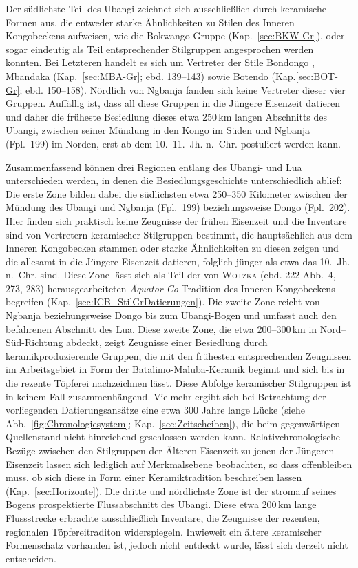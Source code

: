 Der südlichste Teil des \mbox{Ubangi} zeichnet sich ausschließlich durch keramische Formen aus, die entweder starke Ähnlichkeiten zu Stilen des Inneren Kongobeckens aufweisen, wie die Bokwango-Gruppe (Kap.~\ref{sec:BKW-Gr}), oder sogar eindeutig als Teil entsprechender Stilgruppen angesprochen werden konnten. Bei Letzteren handelt es sich um Vertreter der Stile Bondongo \parencite[Kap.~\ref{sec:BDG-Gr};][128--139]{Wotzka.1995}, Mbandaka (Kap.~\ref{sec:MBA-Gr}; ebd. 139--143) sowie Botendo (Kap.\ref{sec:BOT-Gr}; ebd. 150--158). Nördlich von \mbox{Ngbanja} fanden sich keine Vertreter dieser vier Gruppen. Auffällig ist, dass all diese Gruppen in die Jüngere Eisenzeit datieren und daher die früheste Besiedlung dieses etwa 250\,km langen Abschnitts des \mbox{Ubangi}, zwischen seiner Mündung in den Kongo im Süden und \mbox{Ngbanja} (Fpl.~199) im Norden, erst ab dem \mbox{10.--11.~Jh.} n.~Chr. postuliert werden kann.

Zusammenfassend können drei Regionen entlang des \mbox{Ubangi}- und Lua unterschieden werden, in denen die Besiedlungsgeschichte unterschiedlich ablief: Die erste Zone bilden dabei die südlichsten etwa 250--350 Kilometer zwischen der Mündung des \mbox{Ubangi} und \mbox{Ngbanja} (Fpl.~199) beziehungsweise Dongo (Fpl.~202). Hier finden sich praktisch keine Zeugnisse der frühen Eisenzeit und die Inventare sind von Vertretern keramischer Stilgruppen bestimmt, die hauptsächlich aus dem Inneren Kongobecken stammen oder starke Ähnlichkeiten zu diesen zeigen und die allesamt in die Jüngere Eisenzeit datieren, folglich jünger als etwa das 10.~Jh. n.~Chr. sind. Diese Zone lässt sich als Teil der von \textsc{Wotzka} (ebd. 222 Abb.~4, 273, 283) herausgearbeiteten \textit{Äquator-Co}-Tradition des Inneren Kongobeckens begreifen (Kap.~\ref{sec:ICB_StilGrDatierungen}). Die zweite Zone reicht von \mbox{Ngbanja} beziehungsweise Dongo bis zum \mbox{Ubangi}-Bogen und umfasst auch den befahrenen Abschnitt des Lua. Diese zweite Zone, die etwa 200--300\,km in Nord--Süd-Richtung abdeckt, zeigt Zeugnisse einer Besiedlung durch keramikproduzierende Gruppen, die mit den frühesten entsprechenden Zeugnissen im Arbeitsgebiet in Form der Batalimo-Maluba-Keramik beginnt und sich bis in die rezente Töpferei nachzeichnen lässt. Diese Abfolge keramischer Stilgruppen ist in keinem Fall zusammenhängend. Vielmehr ergibt sich bei Betrachtung der vorliegenden Datierungsansätze eine etwa 300 Jahre lange Lücke (siehe Abb.~\ref{fig:Chronologiesystem}; Kap.~\ref{sec:Zeitscheiben}), die beim gegenwärtigen Quellenstand nicht hinreichend geschlossen werden kann. Relativchronologische Bezüge zwischen den Stilgruppen der Älteren Eisenzeit zu jenen der Jüngeren Eisenzeit lassen sich lediglich auf Merkmalsebene beobachten, so dass offenbleiben muss, ob sich diese in Form einer Keramiktradition beschreiben lassen (Kap.~\ref{sec:Horizonte}). Die dritte und nördlichste Zone ist der stromauf seines Bogens prospektierte Flussabschnitt des \mbox{Ubangi}. Diese etwa 200\,km lange Flussstrecke erbrachte ausschließlich Inventare, die Zeugnisse der rezenten, regionalen Töpfereitraditon widerspiegeln. Inwieweit ein ältere keramischer Formenschatz vorhanden ist, jedoch nicht entdeckt wurde, lässt sich derzeit nicht entscheiden.

